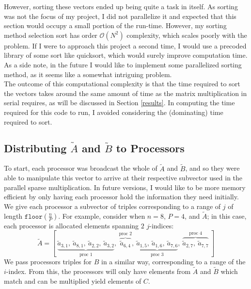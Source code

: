 \documentclass{article}
\begin{document}
However, sorting these vectors ended up being quite a task in itself. As sorting
was not the focus of my project, I did not parallelize it and expected that this
section would occupy a small portion of the run-time. However, my sorting method 
selection sort has order $\mathcal{O}(N^2)$ complexity, which scales poorly with
the problem. If I were to approach this project a second time, I would use a
precoded library of some sort like quicksort, which would surely improve
computation time. As a side note, in the future I would like to implement some
parallelized sorting method, as it seems like a somewhat intriguing problem. \\

The outcome of this computational complexity is that the time required to sort
the vectors takes around the same amount of time as the matrix multiplication in
serial requires, as will be discussed in Section \ref{results}. In computing the
time required for this code to run, I avoided considering the (dominating) time
required to sort. 

\subsection{Distributing $\tilde{A}$ and $\tilde{B}$ to Processors}
To start, each processor was broadcast the whole of $\tilde{A}$ and $\tilde{B}$,
and so they were able to manipulate this vector to arrive at their respective
subvector used in the parallel sparse multiplication. In future versions, I
would like to be more memory efficient by only having each processor hold the
information they need initially.\\

We give each processor a subvector of triples corresponding to a range of $j$ of
length $\texttt{floor}\left(\frac{n}{P}\right)$. For example, consider when
$n=8$, $P=4$, and $\tilde{A}$; in this case, each processor is allocated
elements spanning $2$ $j$-indices:  $$ \tilde{A} = [ \
    \underbrace{\tilde{a}_{3,1}, \  \tilde{a}_{8,1}, \ \tilde{a}_{2,2}, \
    \tilde{a}_{3,2}}_\text{proc 1}, \ \overbrace{\tilde{a}_{6,4}}^\text{proc 2},
    \ \underbrace{\tilde{a}_{1,5}, \ \tilde{a}_{1,6}, \
\tilde{a}_{7,6}}_\text{proc 3}, \ \overbrace{\tilde{a}_{2,7}, \
\tilde{a}_{7,7}}^\text{proc 4} \ ]$$ We pass processors triples for $B$ in a
similar way, corresponding to a range of the $i$-index. From this, the
processors will only have elements from $\tilde{A}$ and $\tilde{B}$ which match
and can be multiplied yield elements of $C$.\\
\end{document}
